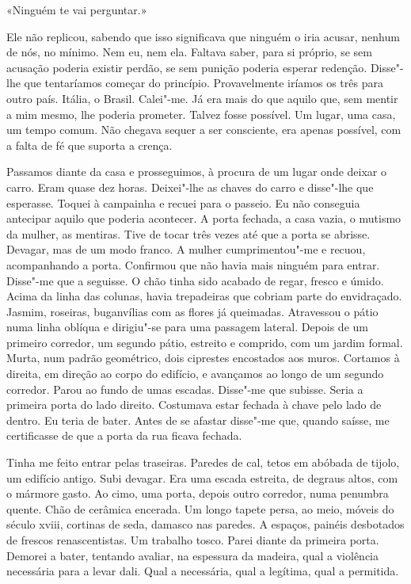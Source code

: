 «Ninguém te vai perguntar.»

Ele não replicou, sabendo que isso significava que ninguém o iria
acusar, nenhum de nós, no mínimo. Nem eu, nem ela. Faltava saber, para
si próprio, se sem acusação poderia existir perdão, se sem punição
poderia esperar redenção. Disse"-lhe que tentaríamos começar do
princípio. Provavelmente iríamos os três para outro país. Itália, o
Brasil. Calei"-me. Já era mais do que aquilo que, sem mentir a mim
mesmo, lhe poderia prometer. Talvez fosse possível. Um lugar, uma casa,
um tempo comum. Não chegava sequer a ser consciente, era apenas
possível, com a falta de fé que suporta a crença.

Passamos diante da casa e prosseguimos, à procura de um lugar onde
deixar o carro. Eram quase dez horas. Deixei"-lhe as chaves do carro e
disse"-lhe que esperasse. Toquei à campainha e recuei para o passeio. Eu
não conseguia antecipar aquilo que poderia acontecer. A porta fechada, a
casa vazia, o mutismo da mulher, as mentiras. Tive de tocar três vezes
até que a porta se abrisse. Devagar, mas de um modo franco. A mulher
cumprimentou"-me e recuou, acompanhando a porta. Confirmou que não havia
mais ninguém para entrar. Disse"-me que a seguisse. O chão tinha sido
acabado de regar, fresco e úmido. Acima da linha das colunas, havia
trepadeiras que cobriam parte do envidraçado. Jasmim, roseiras,
buganvílias com as flores já queimadas. Atravessou o pátio numa linha
oblíqua e dirigiu"-se para uma passagem lateral. Depois de um primeiro
corredor, um segundo pátio, estreito e comprido, com um jardim formal.
Murta, num padrão geométrico, dois ciprestes encostados aos muros.
Cortamos à direita, em direção ao corpo do edifício, e avançamos ao
longo de um segundo corredor. Parou ao fundo de umas escadas. Disse"-me
que subisse. Seria a primeira porta do lado direito. Costumava estar
fechada à chave pelo lado de dentro. Eu teria de bater. Antes de se
afastar disse"-me que, quando saísse, me certificasse de que a porta da
rua ficava fechada.

Tinha me feito entrar pelas traseiras. Paredes de cal, tetos em
abóbada de tijolo, um edifício antigo. Subi devagar. Era uma escada
estreita, de degraus altos, com o mármore gasto. Ao cimo, uma porta,
depois outro corredor, numa penumbra quente. Chão de cerâmica encerada.
Um longo tapete persa, ao meio, móveis do século xviii, cortinas de
seda, damasco nas paredes. A espaços, painéis desbotados de frescos
renascentistas. Um trabalho tosco. Parei diante da primeira porta.
Demorei a bater, tentando avaliar, na espessura da madeira, qual a
violência necessária para a levar dali. Qual a necessária, qual a
legítima, qual a permitida.

